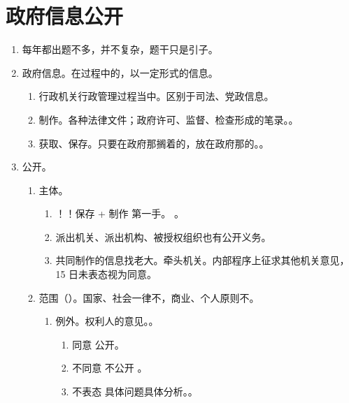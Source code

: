 \section{政府信息公开}
\begin{enumerate}
  \item 每年都出题不多，并不复杂，题干只是引子。
  \item 政府信息。在过程中的，以一定形式的信息。
        \begin{enumerate}
          \item 行政机关行政管理过程当中。区别于司法、党政信息。
          \item 制作。各种法律文件；政府许可、监督、检查形成的笔录。。
          \item 获取、保存。只要在政府那搁着的，放在政府那的。。
        \end{enumerate}
  \item 公开。
        \begin{enumerate}
          \item 主体。
                \begin{enumerate}
                  \item {}！！保存 + 制作 \yjt 第一手。
                        。
                  \item 派出机关、派出机构、被授权组织也有公开义务。
                  \item 共同制作的信息找老大。牵头机关。内部程序上征求其他机关意见，15 日未表态视为同意。
                \end{enumerate}
          \item 范围（）。国家、社会一律不，商业、个人原则不。
                \begin{enumerate}
                  \item 例外。权利人的意见。。
                        \begin{enumerate}
                          \item 同意 \yjt 公开。
                          \item 不同意 \yjt 不公开 \yjt {}。
                          \item 不表态 \yjt 具体问题具体分析。。

\end{enumerate}
\end{enumerate}
\end{enumerate}
\end{enumerate}
